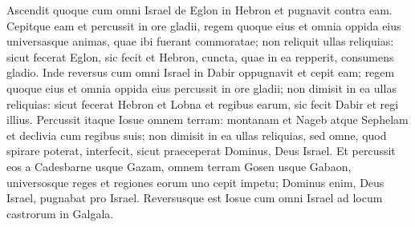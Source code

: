 \begin{biblechapter}
\begin{biblechapter}
\begin{biblechapter}
\begin{biblechapter}
\begin{biblechapter}
\begin{biblechapter}
\begin{biblechapter}
\begin{biblechapter}
\begin{biblechapter}
\begin{biblechapter}
 \verse Ascendit quoque cum omni Israel de Eglon in Hebron et pugnavit contra eam. 
 \verse Cepitque eam et percussit in ore gladii, regem quoque eius et omnia oppida eius universasque animas, quae ibi fuerant commoratae; non reliquit ullas reliquias: sicut fecerat Eglon, sic fecit et Hebron, cuncta, quae in ea repperit, consumens gladio. 
\verse Inde reversus cum omni Israel in Dabir oppugnavit 
\verse et cepit eam; regem quoque eius et omnia oppida eius percussit in ore gladii; non dimisit in ea ullas reliquias: sicut fecerat Hebron et Lobna et regibus earum, sic fecit Dabir et regi illius.
 \verse Percussit itaque Iosue omnem terram: montanam et Nageb atque Sephelam et declivia cum regibus suis; non dimisit in ea ullas reliquias, sed omne, quod spirare poterat, interfecit, sicut praeceperat Dominus, Deus Israel. 
\verse Et percussit eos a Cadesbarne usque Gazam, omnem terram Gosen usque Gabaon, 
\verse universosque reges et regiones eorum uno cepit impetu; Dominus enim, Deus Israel, pugnabat pro Israel. 
\verse Reversusque est Iosue cum omni Israel ad locum castrorum in Galgala.
 

\end{biblechapter}
\end{biblechapter}
\end{biblechapter}
\end{biblechapter}
\end{biblechapter}
\end{biblechapter}
\end{biblechapter}
\end{biblechapter}
\end{biblechapter}
\end{biblechapter}

